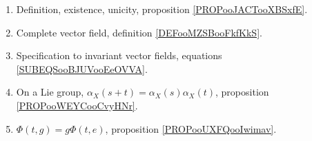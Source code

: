 
    \label{THEMEooVectorFieldFlow}
\begin{enumerate}
    \item
        Definition, existence, unicity, proposition \ref{PROPooJACTooXBSxfE}.
    \item
        Complete vector field, definition \ref{DEFooMZSBooFkfKkS}.
    \item
        Specification to invariant vector fields, equations \eqref{SUBEQSooBJUVooEeOVVA}.
    \item
        On a Lie group, \( \alpha_X(s+t)=\alpha_X(s)\alpha_X(t)\), proposition \ref{PROPooWEYCooCvyHNr}.
    \item
        \( \Phi(t,g)=g\Phi(t,e)\), proposition \ref{PROPooUXFQooIwimav}.
\end{enumerate}
